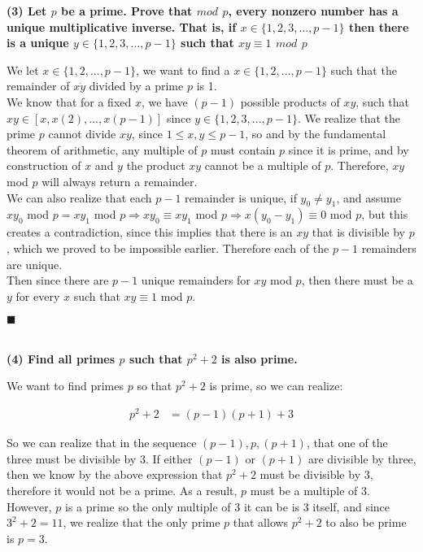 \documentclass[20pt]{article}
\begin{document}
\noindent
\textbf{(3) Let $p$ be a prime. Prove that $mod$ $p$, every nonzero number
has a unique multiplicative inverse. That is, if $x \in \{1, 2, 3, . . . , p - 1\}$ then there is a unique $y \in \{1, 2, 3, . . . , p - 1\}$ such that $xy \equiv 1$ $mod$ $p$}\\
\begin{text}
    \noindent
    We let $x \in \{1, 2, ... , p-1\}$, we want to find a $x \in \{1, 2, ... , p-1\}$ such that the remainder of $x \dot y$ divided by a prime $p$ is 1.\\
    
    \noindent
    We know that for a fixed $x$, we have $(p-1)$ possible products of $xy$, such that $xy \in [x, x(2), ... , x(p-1)]$ since $y \in \{1, 2, 3, . . . , p - 1\}$. We realize that the prime $p$ cannot divide $xy$, since $1 \leq x,y \leq p - 1$, so and by the fundamental theorem of arithmetic, any multiple of $p$ must contain $p$ since it is prime, and by construction of $x$ and $y$ the product $xy$ cannot be a multiple of $p$. Therefore, $xy$ mod $p$ will always return a remainder.\\
    
    \noindent
    We can also realize that each $p - 1$ remainder is unique, if $y_0 \neq y_1$, and assume $xy_0$ mod $p = xy_1$ mod $p \Longrightarrow xy_0 \equiv xy_1$ mod $p \Longrightarrow x(y_0 - y_1) \equiv 0$ mod $p$, but this creates a contradiction, since this implies that there is an $xy$ that is divisible by $p$, which we proved to be impossible earlier. Therefore each of the $p - 1$ remainders are unique.\\
    
    \noindent
    Then since there are $p - 1$ unique remainders for $xy$ mod $p$, then there must be a $y$ for every $x$ such that $xy \equiv 1$ mod $p$.
    
    \hfill $\blacksquare$
\end{text}\\

\noindent
\textbf{(4) Find all primes $p$ such that $p^2 + 2$ is also prime.}
\begin{text}
    \noindent
    We want to find primes $p$ so that $p^2 + 2$ is prime, so we can realize:
    
    \begin{align}
        p^2 + 2 &= (p - 1)(p + 1) + 3\nonumber
    \end{align}
    
    \noindent
    So we can realize that in the sequence $(p - 1), p, (p + 1)$, that one of the three must be divisible by 3. If either $(p - 1)$ or $(p + 1)$ are divisible by three, then we know by the above expression that $p^2 + 2$ must be divisible by 3, therefore it would not be a prime. As a result, $p$ must be a multiple of 3. However, $p$ is a prime so the only multiple of 3 it can be is 3 itself, and since  $3^2 + 2 = 11$, we realize that the only prime $p$ that allows $p^2 + 2$ to also be prime is $p = 3$.
\end{text}\\
\end{document}
